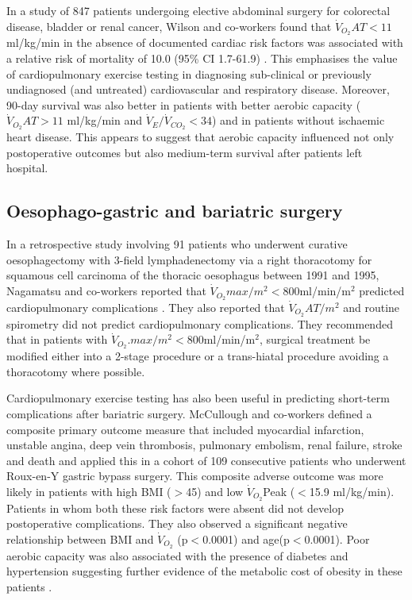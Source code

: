 In a study of 847 patients undergoing elective abdominal surgery for colorectal disease, bladder or renal cancer, Wilson and co-workers found that $\dot{V}_{O_2}AT<11$ ml/kg/min in the absence of documented cardiac risk factors was associated with a relative risk of mortality of 10.0 (95\% CI 1.7-61.9) \parencite{wilson_impaired_2010}. 
This emphasises the value of cardiopulmonary exercise testing in diagnosing sub-clinical or previously undiagnosed (and untreated) cardiovascular and respiratory disease. 
Moreover, 90-day survival was also better in patients with better aerobic capacity ($\dot{V}_{O_2}AT>11$ ml/kg/min and $\dot{V}_E/\dot{V}_{CO_2}<34$) and in patients without ischaemic heart disease. 
This appears to suggest that aerobic capacity influenced not only postoperative outcomes but also medium-term survival after patients left hospital.

\subsection{Oesophago-gastric and bariatric surgery}
In a retrospective study involving 91 patients who underwent curative oesophagectomy with 3-field lymphadenectomy via a
right thoracotomy for squamous cell carcinoma of the thoracic oesophagus between 1991 and 1995, Nagamatsu and co-workers reported that $\dot{V}_{O_2}max/m^2<800$ml/min/m$^2$ predicted cardiopulmonary complications \parencite{nagamatsu_preoperative_2001}. 
They also reported that $\dot{V}_{O_2}AT/m^2$ and routine spirometry did not predict cardiopulmonary complications. 
They recommended that in patients with $\dot{V}_{O_2}. 
max/m^2<800$ml/min/m$^2$, surgical treatment be modified either into a 2-stage procedure or a trans-hiatal procedure avoiding a thoracotomy where possible.

Cardiopulmonary exercise testing has also been useful in predicting short-term complications after bariatric surgery. 
McCullough and co-workers defined a composite primary outcome measure that included myocardial infarction, unstable angina, deep vein thrombosis, pulmonary embolism, renal failure, stroke and death and applied this in a cohort of 109 consecutive patients who underwent Roux-en-Y gastric bypass surgery. 
This composite adverse outcome was more likely in patients with high BMI ($>$45) and low $\dot{V}_{O_2}$Peak ($<$15.9 ml/kg/min). 
Patients in whom both these risk factors were absent did not develop postoperative complications. 
They also observed a significant negative relationship between BMI and $\dot{V}_{O_2}$ (p$<$0.0001) and age(p$<$0.0001). 
Poor aerobic capacity was also associated with the presence of diabetes and hypertension suggesting further evidence of the metabolic cost of obesity in these patients \parencite{mccullough_cardiorespiratory_2006}. 

